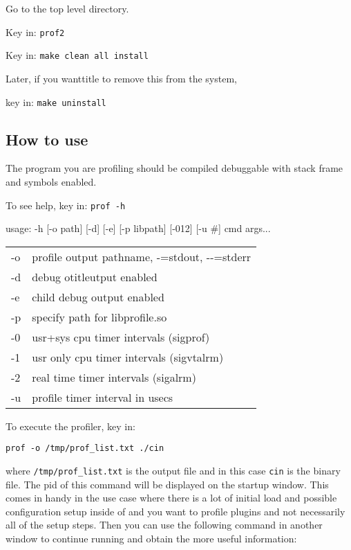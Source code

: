 Go to the top level \CGG{} directory.

Key in: \qquad \texttt{prof2}

Key in: \qquad \texttt{make clean all install}

Later, if you wanttitle to remove this from the system,

key in: \qquad \texttt{make uninstall}

\subsection{How to use}
\label{sub:how_to_use}

The program you are profiling should be compiled debuggable with stack frame and symbols enabled.

To see help, key in: \qquad \texttt{prof -h}

usage: -h [-o path] [-d] [-e] [-p libpath] [-012] [-u \#] cmd args...

\hspace{2em}
\begin{tabular}{@{}ll}
	-o & profile output pathname, -=stdout, -{}-=stderr\\
	-d & debug otitleutput enabled\\
	-e & child debug output enabled\\
	-p & specify path for libprofile.so\\
	-0 & usr+sys cpu timer intervals (sigprof)\\
	-1 & usr only cpu timer intervals (sigvtalrm)\\
	-2 & real time timer intervals (sigalrm)\\
	-u & profile timer interval in usecs\\
\end{tabular}

To execute the profiler, key in:

\hspace{2em}\texttt{prof -o /tmp/prof\_list.txt ./cin}

where \texttt{/tmp/prof\_list.txt} is the output file and in this case \texttt{cin} is the \CGG{} binary file. The pid of this command will be displayed on the startup window. This comes in handy in the use case where there is a lot of initial load and possible configuration setup inside of \CGG{} and you want to profile plugins and not necessarily all of the setup steps. Then you can use the following command in another window to continue running \CGG{} and obtain the more useful information:

